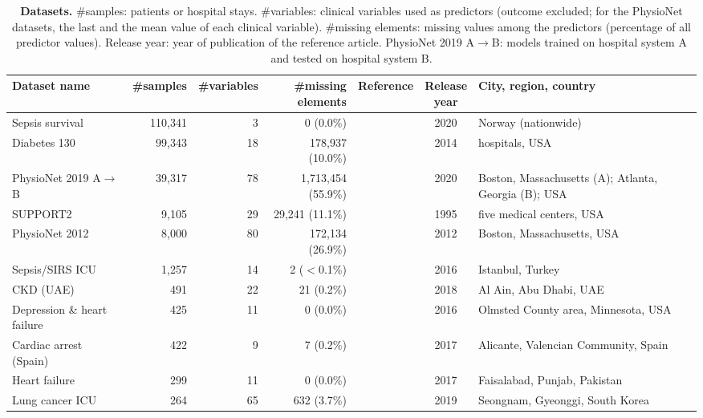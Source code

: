 \begin{table}[!htb]
\centering
\caption{\textbf{Datasets.} \#samples: patients or hospital stays. \#variables: clinical variables used as predictors (outcome excluded; for the PhysioNet datasets, the last and the mean value of each clinical variable). \#missing elements: missing values among the predictors (percentage of all predictor values). Release year: year of publication of the reference article. PhysioNet 2019 A$\rightarrow$B: models trained on hospital system A and tested on hospital system B.}
\label{tab:DATASETS}
{\small
\begin{tabularx}{\textwidth}{lrrrcc>{\raggedright\arraybackslash}X}
\toprule
\rowcolor{white}Dataset name & \#samples & \#variables & \shortstack{\#missing\\elements} & Reference & \shortstack{Release\\year} & City, region, country \\
\midrule
Sepsis survival & 110{,}341 & 3 & 0 (0.0\%) & \cite{chicco2020sepsis} & 2020 & Norway (nationwide) \\
Diabetes 130 & 99{,}343 & 18 & 178{,}937 (10.0\%) & \cite{strack2014impact} & 2014 & 130 hospitals, USA \\
PhysioNet 2019 A$\rightarrow$B & 39{,}317 & 78 & 1{,}713{,}454 (55.9\%) & \cite{reyna2020early} & 2020 & Boston, Massachusetts (A); Atlanta, Georgia (B); USA \\
SUPPORT2 & 9{,}105 & 29 & 29{,}241 (11.1\%) & \cite{knaus1995support} & 1995 & five medical centers, USA \\
PhysioNet 2012 & 8{,}000 & 80 & 172{,}134 (26.9\%) & \cite{silva2012predicting} & 2012 & Boston, Massachusetts, USA \\
Sepsis/SIRS ICU & 1{,}257 & 14 & 2 ($<$0.1\%) & \cite{gucyetmez2016c} & 2016 & Istanbul, Turkey \\
CKD (UAE) & 491 & 22 & 21 (0.2\%) & \cite{alshamsi2018chronic} & 2018 & Al Ain, Abu Dhabi, UAE \\
Depression \& heart failure & 425 & 11 & 0 (0.0\%) & \cite{jani2016comorbid} & 2016 & Olmsted County area, Minnesota, USA \\
Cardiac arrest (Spain) & 422 & 9 & 7 (0.2\%) & \cite{requena2017mortality} & 2017 & Alicante, Valencian Community, Spain \\
Heart failure & 299 & 11 & 0 (0.0\%) & \cite{ahmad2017survival} & 2017 & Faisalabad, Punjab, Pakistan \\
Lung cancer ICU & 264 & 65 & 632 (3.7\%) & \cite{song2019effect} & 2019 & Seongnam, Gyeonggi, South Korea \\
\bottomrule
\end{tabularx}
}
\end{table}
